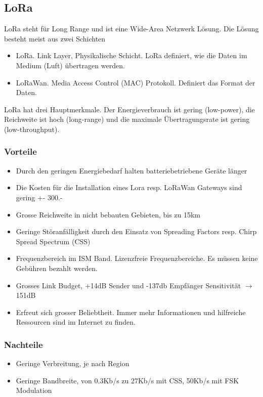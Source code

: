 \documentclass[11pt,english,german]{report}
\theoremstyle{definition}
\begin{document}
\subsection{LoRa}
LoRa steht für Long Range und ist eine Wide-Area Netzwerk Lösung. Die Lösung besteht meist aus zwei Schichten
\begin{itemize}
	\item LoRa. Link Layer, Physikalische Schicht. LoRa definiert, wie die Daten im Medium (Luft) übertragen werden.
	\item LoRaWan. Media Access Control (MAC) Protokoll. Definiert das Format der Daten.
\end{itemize}
LoRa hat drei Hauptmerkmale. Der Energieverbrauch ist gering (low-power), die Reichweite ist hoch (long-range) und die maximale Übertragungsrate ist gering (low-throughput).
\subsubsection{Vorteile}
\begin{itemize}
	\item Durch den geringen Energiebedarf halten batteriebetriebene Geräte länger
	\item Die Kosten für die Installation eines Lora resp. LoRaWan Gateways sind gering +- 300.-
	\item Grosse Reichweite in nicht bebauten Gebieten, bis zu 15km
	\item Geringe Störanfälligkeit durch den Einsatz von Spreading Factors resp. Chirp Spread Spectrum (CSS)
	\item Frequenzbereich im ISM Band. Lizenzfreie Frequenzbereiche. Es müssen keine Gebühren bezahlt werden.
	\item Grosses Link Budget, +14dB Sender und -137db Empfänger Sensitivität $\rightarrow$ 151dB
	\item Erfreut sich grosser Beliebtheit. Immer mehr Informationen und hilfreiche Ressourcen sind im Internet zu finden.
\end{itemize}
\subsubsection{Nachteile}
\begin{itemize}
	\item Geringe Verbreitung, je nach Region
	\item Geringe Bandbreite, von 0.3Kb/s zu 27Kb/s mit CSS, 50Kb/s mit FSK Modulation \cite{loradatarate}
\end{itemize}
\end{document}
